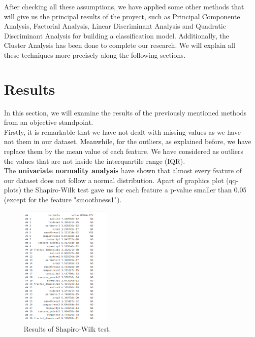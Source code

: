\documentclass[10pt,a4paper]{article}
\theoremstyle{definition}
\theoremstyle{definition}
\begin{document}
After checking all these assumptions, we have applied some other methods that will give us the principal results of the proyect, such as Principal Componente Analysis, Factorial Analysis, Linear Discriminant Analysis and Quadratic Discriminant Analysis for building a classification model. Additionally, the Cluster Analysis has been done to complete our research. We will explain all these techniques more precisely along the following sections.

\newpage

\section{Results}

In this section, we will examine the results of the previously mentioned methods from an objective standpoint. \\

Firstly, it is remarkable that we have not dealt with missing values as we have not them  in our dataset. Meanwhile, for the outliers, as explained before, we have replace them by the mean value of each feature. We have considered as outliers the values that are not inside the interquartile range (IQR). \\


The \textbf{univariate normality analysis} have shown that almost every feature of our dataset does not follow a normal distribution. Apart of graphics plot (qq-plots) the Shapiro-Wilk test gave us for each feature a p-value smaller than 0.05 (except for the feature "smoothness1"). \\

\begin{figure}[h]
	\centering
	\includegraphics[width=0.4\textwidth]{shapiro_wilktest.png}
	\caption{Results of Shapiro-Wilk test.}
	\label{fig:etiqueta2}
\end{figure}
\end{document}

